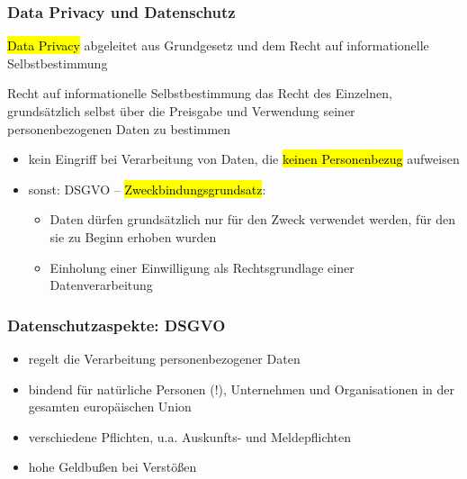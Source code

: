 \begin{frame}
  \frametitle{Data Privacy und Datenschutz}

 
\hl{Data Privacy} abgeleitet aus Grundgesetz und dem Recht auf informationelle Selbstbestimmung

\begin{block}{Recht auf informationelle Selbstbestimmung}
das Recht des Einzelnen, grundsätzlich selbst über die Preisgabe und Verwendung seiner personenbezogenen Daten zu bestimmen
\end{block}

\begin{itemize}
  \item kein Eingriff bei Verarbeitung von Daten, die \hl{keinen Personenbezug} aufweisen
  \item sonst: DSGVO -- \hl{Zweckbindungsgrundsatz}: 
  \begin{itemize}
    \item Daten dürfen grundsätzlich nur für den Zweck verwendet werden, für den sie zu Beginn erhoben wurden 
    \item  Einholung einer Einwilligung als Rechtsgrundlage einer Datenverarbeitung
  \end{itemize}
\end{itemize}
\end{frame}


\begin{frame}
  \frametitle{Datenschutzaspekte: DSGVO}
  
  \begin{itemize}
  \item regelt die Verarbeitung personenbezogener Daten
  \item bindend für natürliche Personen (!), Unternehmen und Organisationen in der gesamten europäischen Union
  \item verschiedene Pflichten, u.a. Auskunfts- und Meldepflichten
  \item hohe Geldbußen bei Verstößen
  \end{itemize}
      
  \end{frame}
  
  

